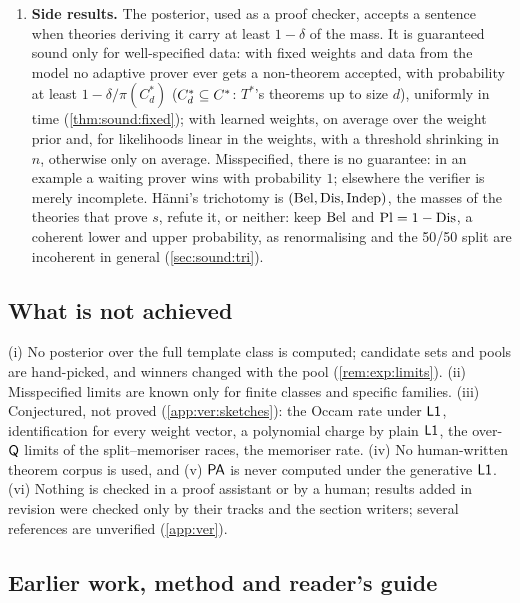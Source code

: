 \begin{enumerate}[resume*]

\item \textbf{Side results.} The posterior, used as a proof checker, accepts a sentence when theories deriving it carry at least $1-\delta$ of the mass. It is guaranteed sound only for well-specified data: with fixed weights and data from the model no adaptive prover ever gets a non-theorem accepted, with probability at least $1-\delta/\pi(C^*_d)$ ($C^*_d\subseteq C^{*}$: $T^*$'s theorems up to size $d$), uniformly in time (\cref{thm:sound:fixed}); with learned weights, on average over the weight prior and, for likelihoods linear in the weights, with a threshold shrinking in $n$, otherwise only on average. Misspecified, there is no guarantee: in an example a waiting prover wins with probability $1$; elsewhere the verifier is merely incomplete. H\"anni's trichotomy is $(\mathrm{Bel},\mathrm{Dis},\mathrm{Indep})$, the masses of the theories that prove $s$, refute it, or neither: keep $\mathrm{Bel}$ and $\mathrm{Pl}=1-\mathrm{Dis}$, a coherent lower and upper probability, as renormalising and the 50/50 split are incoherent in general (\cref{sec:sound:tri}).
\end{enumerate}

\subsection{What is not achieved}\label{sec:intro:contrib}

(i) No posterior over the full template class is computed; candidate sets and pools are hand-picked, and winners changed with the pool (\cref{rem:exp:limits}). (ii) Misspecified limits are known only for finite classes and specific families. (iii) Conjectured, not proved (\cref{app:ver:sketches}): the Occam rate under $\mathord{\mathsf{L1}}$, identification for every weight vector, a polynomial charge by plain $\mathord{\mathsf{L1}}$, the over-$\mathsf{Q}$ limits of the split--memoriser races, the memoriser rate. (iv) No human-written theorem corpus is used, and (v) $\mathsf{PA}$ is never computed under the generative $\mathord{\mathsf{L1}}$. (vi) Nothing is checked in a proof assistant or by a human; results added in revision were checked only by their tracks and the section writers; several references are unverified (\cref{app:ver}).

\subsection{Earlier work, method and reader's guide}\label{sec:intro:guide}

